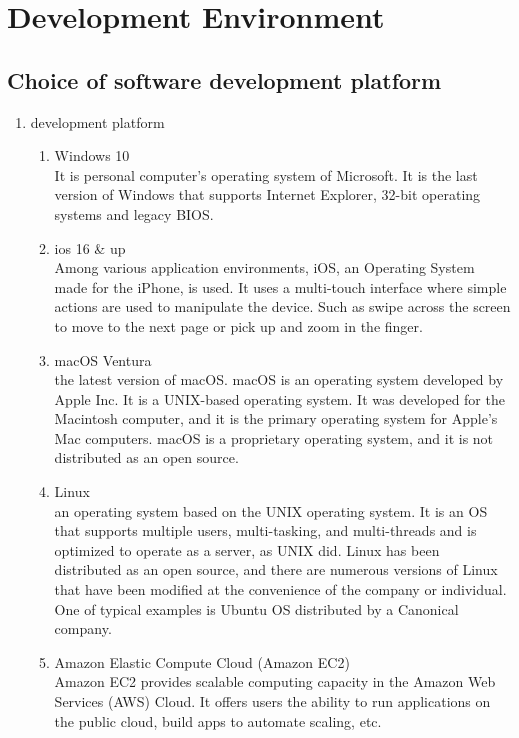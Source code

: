 \documentclass[conference]{IEEEtran}
\begin{document}
\section{\large{Development Environment}}
\subsection{Choice of software development platform}
\begin{enumerate}
    \item development platform
    \begin{enumerate}
        \item Windows 10\\
        It is personal computer’s operating system of Microsoft. It is the last version of Windows that supports Internet Explorer, 32-bit operating systems and legacy BIOS.
        \\
        \item ios 16 \& up\\
        Among various application environments, iOS, an Operating System made for the iPhone, is used. It uses a multi-touch interface where simple actions are used to manipulate the device. Such as swipe across the screen to move to the next page or pick up and zoom in the finger.
        \\
        \item macOS Ventura\\
        the latest version of macOS. macOS is an operating system developed by Apple Inc. It is a UNIX-based operating system. It was developed for the Macintosh computer, and it is the primary operating system for Apple's Mac computers. macOS is a proprietary operating system, and it is not distributed as an open source.
        \\
        \item Linux\\
        an operating system based on the UNIX operating system. It is an OS that supports multiple users, multi-tasking, and multi-threads and is optimized to operate as a server, as UNIX did. Linux has been distributed as an open source, and there are numerous versions of Linux that have been modified at the convenience of the company or individual. One of typical examples is Ubuntu OS distributed by a Canonical company.
        \\
        \item Amazon Elastic Compute Cloud (Amazon EC2)\\
        Amazon EC2 provides scalable computing capacity in the Amazon Web Services (AWS) Cloud. It offers users the ability to run applications on the public cloud, build apps to automate scaling, etc.

\end{enumerate}
\end{enumerate}
\end{document}
